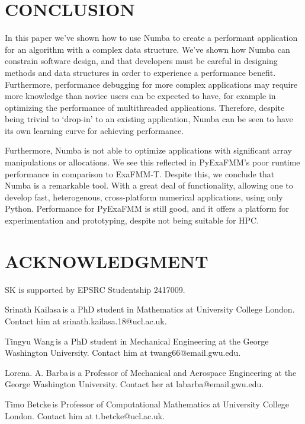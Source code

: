 \documentclass{IEEEcsmag}
\begin{document}
\section{CONCLUSION}

In this paper we've shown how to use Numba to create a performant application for an algorithm with a complex data structure. We've shown how Numba can constrain software design, and that developers must be careful in designing methods and data structures in order to experience a performance benefit. Furthermore, performance debugging for more complex applications may require more knowledge than novice users can be expected to have, for example in optimizing the performance of multithreaded applications. Therefore, despite being trivial to `drop-in' to an existing application, Numba can be seen to have its own learning curve for achieving performance.

Furthermore, Numba is not able to optimize applications with significant array manipulations or allocations. We see this reflected in PyExaFMM's poor runtime performance in comparison to ExaFMM-T. Despite this, we conclude that Numba is a remarkable tool. With a great deal of functionality, allowing one to develop fast, heterogenous, cross-platform numerical applications, using only Python. Performance for PyExaFMM is still good, and it offers a platform for experimentation and prototyping, despite not being suitable for HPC.

\section{ACKNOWLEDGMENT}

SK is supported by EPSRC Studentship 2417009.

\vspace{50pt}




\begin{IEEEbiography}{Srinath Kailasa}{\,}is a PhD student in Mathematics at University College London. Contact him at srinath.kailasa.18@ucl.ac.uk.
\end{IEEEbiography}

\begin{IEEEbiography}{Tingyu Wang}{\,}is a PhD student in Mechanical Engineering at the George Washington University. Contact him at twang66@email.gwu.edu.
\end{IEEEbiography}

\begin{IEEEbiography}{Lorena. A. Barba}{\,}is a Professor of Mechanical and Aerospace Engineering at the George Washington University.  Contact her at labarba@email.gwu.edu.
\end{IEEEbiography}

\begin{IEEEbiography}{Timo Betcke}{\,}is Professor of Computational Mathematics at University College London. Contact him at t.betcke@ucl.ac.uk.
\end{IEEEbiography}
\end{document}
